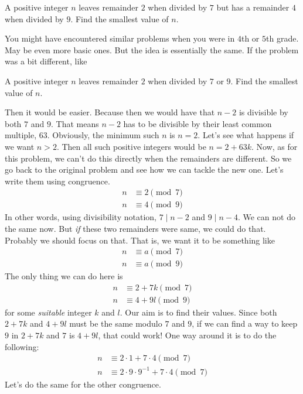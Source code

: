 \documentclass{subfile}
\begin{document}
	\begin{problem}
		A positive integer $n$ leaves remainder $2$ when divided by $7$ but has a remainder $4$ when divided by $9$. Find the smallest value of $n$.
	\end{problem}
	You might have encountered similar problems when you were in $4$th or $5$th grade. May be even more basic ones. But the idea is essentially the same. If the problem was a bit different, like
	\begin{problem}
		A positive integer $n$ leaves remainder $2$ when divided by $7$ or $9$. Find the smallest value of $n$.
	\end{problem}
	Then it would be easier. Because then we would have that $n-2$ is
	divisible by both $7$ and $9$. That means $n-2$ has to be divisible by their least common multiple, $63$. Obviously, the minimum such $n$ is $n=2$. Let's see what happens if we want $n>2$. Then all such positive integers would be $n=2+63k$. Now, as for this problem, we can't do this directly when the remainders are different. So we go back to the original problem and see how we can tackle the new one. Let's write them using congruence.
	\begin{align*}
		n & \equiv2\pmod{7}\\
		n & \equiv4\pmod{9}
	\end{align*}
	In other words, using divisibility notation, $7\mid n-2$ and $9\mid n-4$. We can not do the same now. But \textit{if} these two remainders were same, we could do that. Probably we should focus on that. That is, we want it to be something like
		\begin{align*}
			n & \equiv a\pmod 7\\
			n & \equiv a\pmod 9
		\end{align*}
	The only thing we can do here is
		\begin{align*}
			n & \equiv2+7k\pmod7\\
			n & \equiv4+9l\pmod9
		\end{align*}
	for some \textit{suitable} integer $k$ and $l$. Our aim is to find their values. Since both $2+7k$ and $4+9l$ must be the same modulo $7$ and $9$, if we can find a way to keep $9$ in $2+7k$ and $7$ is $4+9l$, that could work! One way around it is to do the following:
		\begin{align*}
			n & \equiv2\cdot1+7\cdot4\pmod7\\
			n & \equiv2\cdot9\cdot9^{-1}+7\cdot4\pmod{7}
		\end{align*}
	Let's do the same for the other congruence.
\end{document}
